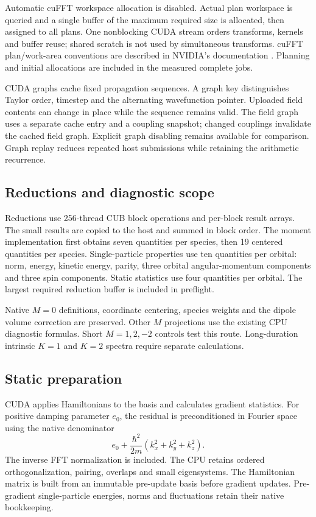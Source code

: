 \documentclass[11pt,a4paper]{article}
\newcommand{\code}[1]{\texttt{\detokenize{#1}}}
\begin{document}
Automatic cuFFT workspace allocation is disabled. Actual plan workspace is
queried and a single buffer of the maximum required size is allocated, then
assigned to all plans. One nonblocking CUDA stream orders transforms, kernels
and buffer reuse; shared scratch is not used by simultaneous transforms.
cuFFT plan/work-area conventions are described in NVIDIA's documentation
\cite{cufft}. Planning and initial allocations are included in the measured
complete jobs.

CUDA graphs cache fixed propagation sequences. A graph key distinguishes
Taylor order, timestep and the alternating wavefunction pointer. Uploaded
field contents can change in place while the sequence remains valid. The
field graph uses a separate cache entry and a coupling snapshot; changed
couplings invalidate the cached field graph. Explicit graph disabling remains
available for comparison. Graph replay reduces repeated host submissions while retaining the
arithmetic recurrence.

\subsection{Reductions and diagnostic scope}
Reductions use 256-thread CUB block operations and per-block result arrays.
The small results are copied to the host and summed in block order. The
moment implementation first obtains seven quantities per species, then
19 centered quantities per species. Single-particle properties use ten
quantities per orbital: norm, energy, kinetic energy, parity, three orbital
angular-momentum components and three spin components. Static statistics use
four quantities per orbital. The largest required reduction buffer is
included in preflight.

Native $M=0$ definitions, coordinate centering, species weights and the
dipole volume correction are preserved. Other $M$ projections use the
existing CPU diagnostic formulas. Short $M=1,2,-2$ controls test this route. Long-duration intrinsic
$K=1$ and $K=2$ spectra require separate calculations.

\subsection{Static preparation}
CUDA applies Hamiltonians to the basis and calculates gradient statistics.
For positive damping parameter $e_0$, the residual is preconditioned in
Fourier space using the native denominator
\begin{equation}
 e_0+\frac{\hbar^2}{2m}(k_x^2+k_y^2+k_z^2).
\end{equation}
The inverse FFT normalization is included. The CPU retains ordered
orthogonalization, pairing, overlaps and small \code{ZHEEVD} eigensystems.
The Hamiltonian matrix is built from an immutable pre-update basis before
gradient updates. Pre-gradient single-particle energies, norms and
fluctuations retain their native bookkeeping.
\end{document}
